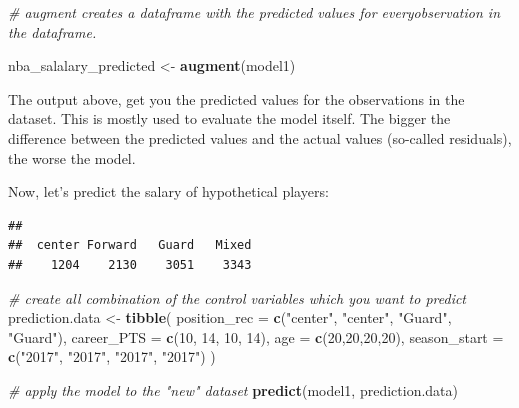 \documentclass[
]{book}
\newenvironment{Shaded}{\begin{snugshade}}{\end{snugshade}}
\newcommand{\AttributeTok}[1]{\textcolor[rgb]{0.13,0.29,0.53}{#1}}
\newcommand{\CommentTok}[1]{\textcolor[rgb]{0.56,0.35,0.01}{\textit{#1}}}
\newcommand{\DecValTok}[1]{\textcolor[rgb]{0.00,0.00,0.81}{#1}}
\newcommand{\FunctionTok}[1]{\textcolor[rgb]{0.13,0.29,0.53}{\textbf{#1}}}
\newcommand{\NormalTok}[1]{#1}
\newcommand{\OtherTok}[1]{\textcolor[rgb]{0.56,0.35,0.01}{#1}}
\newcommand{\SpecialCharTok}[1]{\textcolor[rgb]{0.81,0.36,0.00}{\textbf{#1}}}
\newcommand{\StringTok}[1]{\textcolor[rgb]{0.31,0.60,0.02}{#1}}
\begin{document}
\begin{Shaded}
\begin{Highlighting}[]
\CommentTok{\# augment creates a dataframe with the predicted values for everyobservation in the dataframe. }

\NormalTok{nba\_salalary\_predicted }\OtherTok{\textless{}{-}} \FunctionTok{augment}\NormalTok{(model1)}
\end{Highlighting}
\end{Shaded}

The output above, get you the predicted values for the observations in the dataset. This is mostly used to evaluate the model itself. The bigger the difference between the predicted values and the actual values (so-called residuals), the worse the model.

Now, let's predict the salary of hypothetical players:

\begin{Shaded}
\end{Shaded}

\begin{verbatim}
## 
##  center Forward   Guard   Mixed 
##    1204    2130    3051    3343
\end{verbatim}

\begin{Shaded}
\begin{Highlighting}[]
\CommentTok{\# create all combination of the control variables which you want to predict}
\NormalTok{prediction.data }\OtherTok{\textless{}{-}} \FunctionTok{tibble}\NormalTok{(}
  \AttributeTok{position\_rec =} \FunctionTok{c}\NormalTok{(}\StringTok{"center"}\NormalTok{, }\StringTok{"center"}\NormalTok{, }\StringTok{"Guard"}\NormalTok{, }\StringTok{"Guard"}\NormalTok{),}
  \AttributeTok{career\_PTS =} \FunctionTok{c}\NormalTok{(}\DecValTok{10}\NormalTok{, }\DecValTok{14}\NormalTok{, }\DecValTok{10}\NormalTok{, }\DecValTok{14}\NormalTok{),}
  \AttributeTok{age =} \FunctionTok{c}\NormalTok{(}\DecValTok{20}\NormalTok{,}\DecValTok{20}\NormalTok{,}\DecValTok{20}\NormalTok{,}\DecValTok{20}\NormalTok{),}
  \AttributeTok{season\_start =} \FunctionTok{c}\NormalTok{(}\StringTok{"2017"}\NormalTok{, }\StringTok{"2017"}\NormalTok{, }\StringTok{"2017"}\NormalTok{, }\StringTok{"2017"}\NormalTok{)}
\NormalTok{)}

\CommentTok{\# apply the model to the "new" dataset}
\FunctionTok{predict}\NormalTok{(model1, }
\NormalTok{        prediction.data)}
\end{Highlighting}
\end{Shaded}
\end{document}
